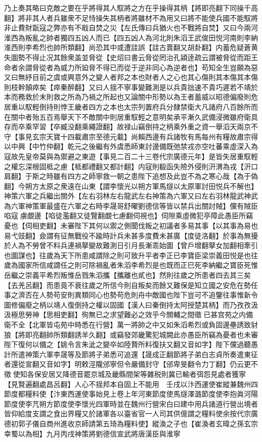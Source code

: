 乃上奏其略曰克敵之要在乎將得其人馭將之方在乎操得其柄【將即亮翻下同操千高翻】將非其人者兵雖衆不足恃操失其柄者將雖材不為用又曰將不能使兵國不能馭將非止費財翫寇之弊亦有不戢自焚之災【左氏傳曰兵猶火也不戰將自焚】又曰今兩河淮西為叛亂之帥者獨四五凶人而已【四五凶人為河北則朱滔王武俊田悦河南則李納淮西則李希烈也帥所類翻】尚恐其中或遭詿誤【詿古賣翻又胡卦翻】内蓄危疑蒼黄失圖勢不得止况其餘衆盖並脅從【史炤曰書云脅從罔治孔潁逹疏云謂被脅從而距王命者余謂脅從者為威力所廹脅不得已而從于逆非同心為逆者也】苟知全生豈願為惡又曰無紓目前之虞或興意外之變人者邦之本也財者人之心也其心傷則其本傷其本傷則枝幹顛瘁矣【瘁秦醉翻】又曰人揺不寧事變難測是以兵貴拙速不貴巧遲若不靖於本而務救於末則救之所為乃禍之所起也又論關中形勢以為王者蓄威以昭德偏廢則危居重以馭輕倒持則悖王畿者四方之本也太宗列置府兵分隸禁衛大凡諸府八百餘所而在關中者殆五百焉舉天下不敵關中則居重馭輕之意明矣承平漸久武備浸微雖府衛具存而卒乘罕習【卒臧没翻乘繩證翻】故禄山竊倒持之柄乘外重之資一舉滔天兩京不守【事見玄宗天寶十四載肅宗至德元載】尚賴西邊有兵諸牧有馬每州有糧故肅宗得以中興【中竹仲翻】乾元之後繼有外虞悉師東討邊備既弛禁戎亦空吐蕃乘虛深入為寇故先皇帝莫與為禦避之東遊【事見二百二十三卷代宗廣德元年】是皆失居重馭輕之權忘深根固柢之慮【柢都禮翻又都計翻】内寇則殽函失險外侵則汧渭為戎【汧口肩翻】于斯之時雖有四方之師寧救一朝之患陛下追想及此豈不為之寒心哉【為于偽翻】今朔方太原之衆遠在山東【謂李懷光以朔方軍馬燧以太原軍討田悦兵不解也】神策六軍之兵繼出關外【左右羽林左右龍武左右神策為六軍又曰左右羽林龍武神武為六軍神策軍最盛在六軍之右時李晟哥舒曜劉德信等皆以禁兵出關討賊】儻有賊臣啗寇虜覷邊【啗徒濫翻又徒覽翻覷七慮翻伺視也】伺隙乘虛微犯亭障此愚臣所竊憂也【伺相吏翻】未審陛下其何以禦之側聞伐叛之初議者多易其事【以其事為易也易弋豉翻】僉謂有征無戰役不踰時計兵未甚多度費未甚廣【度徒洛翻】於事為無擾於人為不勞曾不料兵連禍拏變故難測日引月長漸乖始圖【曾戶增翻拏女加翻相牽引也圖謀也】往歲為天下所患咸謂除之則可致升平者李正已李寶臣梁崇義田悦是也往歲為國家所信咸謂任之則可除禍亂者朱滔李希烈是也既而正巳死李納繼之寶臣死惟岳繼之崇義平希烈叛惟岳戮朱滔攜【攜離也貳也】然則往歲之所患者四去其三矣【去羌呂翻】而患竟不衰往歲之所信今則自叛矣而餘又難保是知立國之安危在勢任事之濟否在人勢苟安則異類同心也勢苟危則舟中敵國也陛下豈可不追鑒往事惟新令圖修偏廢之柄以靖人復倒持之權以固國【漢人曰秦倒持太阿授楚其柄】而乃孜孜汲汲極思勞神【思相吏翻】徇無已之求望難必之效乎今關輔之間徵已甚宫苑之内備衛不全【北軍皆屯苑中時悉在行營】萬一將帥之中又如朱滔希烈或負固邊壘誘致豺狼【將即亮翻帥所類翻誘羊久翻】或竊發郊畿驚犯城闕此亦愚臣所竊為憂者也未審陛下復何以備之【姚令言朱泚之變卒如陸贄所料復扶又翻又音如字】陛下儻過聽愚計所遣神策六軍李晟等及節將子弟悉可追還【晟成正翻節將子弟白志貞所奏遣東征者還從宣翻又音如字】明敕涇隴邠寧但令嚴備封守【邠卑旻翻令力丁翻】仍云更不徵使知各保安居又降德音罷京城及畿縣間架等雜税則冀已輸者弭怨見處者獲寧【見賢遍翻處昌呂翻】人心不揺邦本自固上不能用　壬戌以汴西運使崔縱兼魏州四節度都糧料使【汴東西運使事始見上卷上年河東節度使馬燧澤潞節度使李抱眞河陽節度使李芁朔方節度使李懷光四軍時並在魏州行營宋白曰建中用兵諸道行營出境者皆仰給度支謂之食出界糧又於諸軍各以臺省官一人司其供億謂之糧料使余按代宗廣德初郭子儀自商州進收京師請第五琦為糧料使】縱渙之子也【崔渙者玄暐之孫玄宗幸蜀以為相】九月丙戌神策將劉德信宣武將唐漢臣與淮寧

